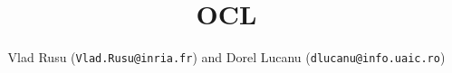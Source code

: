 
\setlength{\parindent}{1em}


\newcommand{\ocl}{\mbox{\textsc{ocl}}\xspace}

\title{OCL}
\author{
  Vlad Rusu (\texttt{Vlad.Rusu@inria.fr}) and 
  Dorel Lucanu (\texttt{dlucanu@info.uaic.ro})
}

\maketitle


\vspace*{3ex}

